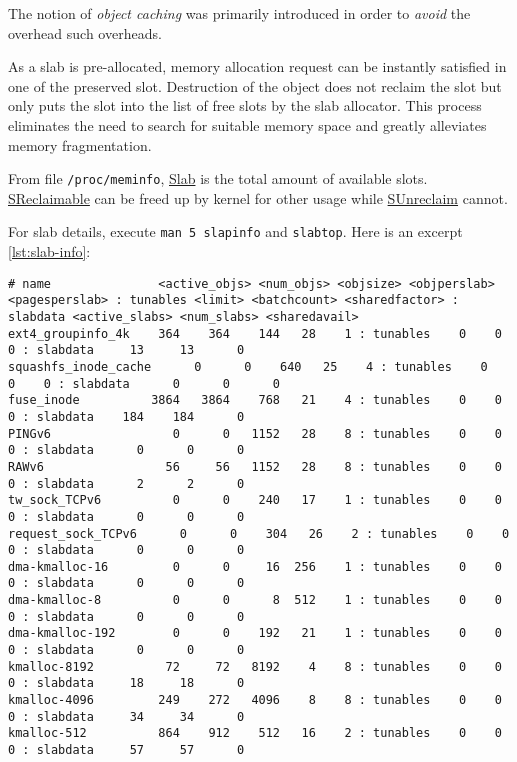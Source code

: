 \begin{landscape}
  The notion of \textit{object caching} was primarily introduced
  in order to \textit{avoid} the overhead such overheads.

  As a slab is pre-allocated, memory allocation request can be
  instantly satisfied in one of the preserved slot. Destruction of
  the object does not reclaim the slot but only puts the slot into
  the list of free slots by the slab allocator. This process
  eliminates the need to search for suitable memory space and
  greatly alleviates memory fragmentation.

  From file \lstinline|/proc/meminfo|, \uline{Slab} is the total
  amount of available slots. \uline{SReclaimable} can be freed up
  by kernel for other usage while \uline{SUnreclaim} cannot.

  For slab details, execute \lstinline|man 5 slapinfo| and
  \lstinline|slabtop|. Here is an excerpt \ref{lst:slab-info}:

\begin{lstlisting}[caption={Slab Info},label={lst:slab-info},basicstyle=\tiny\ttfamily]
# name               <active_objs> <num_objs> <objsize> <objperslab> <pagesperslab> : tunables <limit> <batchcount> <sharedfactor> : slabdata <active_slabs> <num_slabs> <sharedavail>
ext4_groupinfo_4k    364    364    144   28    1 : tunables    0    0    0 : slabdata     13     13      0
squashfs_inode_cache      0      0    640   25    4 : tunables    0    0    0 : slabdata      0      0      0
fuse_inode          3864   3864    768   21    4 : tunables    0    0    0 : slabdata    184    184      0
PINGv6                 0      0   1152   28    8 : tunables    0    0    0 : slabdata      0      0      0
RAWv6                 56     56   1152   28    8 : tunables    0    0    0 : slabdata      2      2      0
tw_sock_TCPv6          0      0    240   17    1 : tunables    0    0    0 : slabdata      0      0      0
request_sock_TCPv6      0      0    304   26    2 : tunables    0    0    0 : slabdata      0      0      0
dma-kmalloc-16         0      0     16  256    1 : tunables    0    0    0 : slabdata      0      0      0
dma-kmalloc-8          0      0      8  512    1 : tunables    0    0    0 : slabdata      0      0      0
dma-kmalloc-192        0      0    192   21    1 : tunables    0    0    0 : slabdata      0      0      0
kmalloc-8192          72     72   8192    4    8 : tunables    0    0    0 : slabdata     18     18      0
kmalloc-4096         249    272   4096    8    8 : tunables    0    0    0 : slabdata     34     34      0
kmalloc-512          864    912    512   16    2 : tunables    0    0    0 : slabdata     57     57      0
\end{lstlisting}


\end{landscape}

